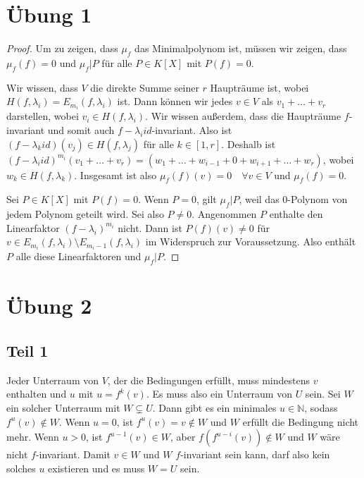 \documentclass[10pt,a4paper]{article}
\begin{document}
\section*{Übung 1}

\begin{proof}
Um zu zeigen, dass $\mu_{f}$ das Minimalpolynom ist, müssen wir zeigen, dass $\mu_{f}(f) = 0$ und $\mu_{f} | P$ für alle $P \in K[X]$ mit $P(f) = 0$.

Wir wissen, dass $V$ die direkte Summe seiner $r$ Haupträume ist, wobei $H(f, \lambda_{i}) = E_{m_{i}}(f, \lambda_{i})$ ist.
Dann können wir jedes $v \in V$ als $v_{1} + \dots + v_{r}$ darstellen, wobei $v_{i} \in H(f, \lambda_{i})$.
Wir wissen außerdem, dass die Haupträume $f$-invariant und somit auch $f - \lambda_{i}id$-invariant.
Also ist $(f - \lambda_{k}id)(v_{j}) \in H(f, \lambda_{j})$ für alle $k \in [1, r]$.
Deshalb ist $(f - \lambda_{i}id)^{m_{i}}(v_{1} + \dots + v_{r}) = (w_{1} + \dots + w_{i - 1} + 0 + w_{i + 1} + \dots + w_{r})$, wobei $w_{k} \in H(f, \lambda_{k})$.
Insgesamt ist also $\mu_{f}(f)(v) = 0 \quad \forall v \in V$ und $\mu_{f}(f) = 0$.

Sei $P \in K[X]$ mit $P(f) = 0$.
Wenn $P = 0$, gilt $\mu_{f} | P$, weil das $0$-Polynom von jedem Polynom geteilt wird.
Sei also $P \ne 0$.
Angenommen $P$ enthalte den Linearfaktor $(f - \lambda_{i})^{m_{i}}$ nicht.
Dann ist $P(f)(v) \ne 0$ für $v \in E_{m_{i}}(f, \lambda_{i}) \setminus E_{m_{i} - 1}(f, \lambda_{i})$ im Widerspruch zur Voraussetzung.
Also enthält $P$ alle diese Linearfaktoren und $\mu_{f} | P$.
\end{proof}

\section*{Übung 2}

\subsection*{Teil 1}

Jeder Unterraum von $V$, der die Bedingungen erfüllt, muss mindestens $v$ enthalten und $u$ mit $u = f^{k}(v)$.
Es muss also ein Unterraum von $U$ sein.
Sei $W$ ein solcher Unterraum mit $W \subsetneq U$.
Dann gibt es ein minimales $u \in \mathbb{N}$, sodass $f^{u}(v) \notin W$.
Wenn $u = 0$, ist $f^{u}(v) = v \notin W$ und $W$ erfüllt die Bedingung nicht mehr.
Wenn $u > 0$, ist $f^{u - 1}(v) \in W$, aber $f(f^{u - i}(v)) \notin W$ und $W$ wäre nicht $f$-invariant.
Damit $v \in W$ und $W$ $f$-invariant sein kann, darf also kein solches $u$ existieren und es muss $W = U$ sein.
\end{document}
